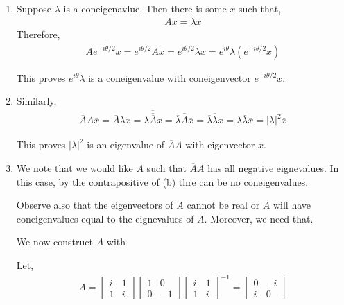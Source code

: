 \documentclass[10pt]{article}
\begin{document}
\begin{solution}[Solution]
\begin{enumerate}[label=(\alph*)]
    \item Suppose \( \lambda \) is a coneigenavlue. Then there is some \( x \) such that,
        \begin{align*}
            A \overline{x}  =\lambda x
        \end{align*}
        Therefore,
        \begin{align*}
            A \overline{e^{-i\theta/2}x}
            = e^{i\theta/2} A\overline{x}
            = e^{i\theta/2} \lambda x
            = e^{i\theta} \lambda \left( e^{-i \theta/2} x \right)
        \end{align*}
        
        This proves \( e^{i\theta} \lambda \) is a coneigenvalue with coneigenvector \( e^{-i\theta/2} x \).

    \item Similarly,
        \begin{align*}
            \overline{A} A \overline{x} 
            = \overline{A} \lambda x 
            = \overline{\overline{\lambda \overline{A} x}}
            = \overline{\overline{\lambda} A \overline{x}}
            = \overline{\overline{\lambda} \lambda x}
            = \lambda \overline{\lambda} \overline{x}
            = |\lambda|^2 \overline{x}
        \end{align*}
        
        This proves \( |\lambda|^2 \) is an eigenvalue of \( \overline{A}A \) with eigenvector \( \overline{x} \).
        
    \item 
        We note that we would like \( A \) such that \( \overline{A}A \) has all negative eignevalues. In this case, by the contrapositive of (b) thre can be no coneigenvalues.

        Observe also that the eigenvectors of \( A \) cannot be real or \( A \) will have coneigenvalues equal to the eignevalues of \( A \). Moreover, we need that.

        We now construct \( A \) with 

        Let,
        \begin{align*}
            A = \left[\begin{array}{cc}i & 1 \\ 1 & i\end{array}\right]
                \left[\begin{array}{cc}1 & 0 \\0 & -1 \end{array}\right]
                \left[\begin{array}{cc}i & 1 \\ 1 & i\end{array}\right]^{-1}
            =
            \left[\begin{array}{cc}0 & -i \\ i & 0\end{array}\right]
        \end{align*}
        

\end{enumerate}
\end{solution}
\end{document}
